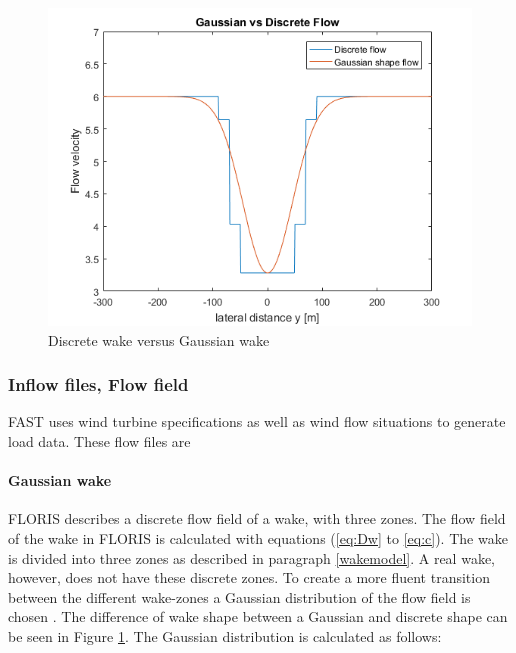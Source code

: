 \begin{figure}
  \includegraphics[width=\linewidth]{./Figures/PlotGausDiscWakeDWake180U6yaw0.png} %
  \caption{Discrete wake versus Gaussian wake} %
  \label{fig:disgaus}
\end{figure}


\subsubsection{Inflow files, Flow field}
FAST uses wind turbine specifications as well as wind flow situations to generate load data. These flow files are 
\paragraph{Gaussian wake}
FLORIS describes a discrete flow field of a wake, with three zones. The flow field of the wake in FLORIS is calculated with equations (\ref{eq:Dw} to \ref{eq:c}). The wake is divided into three zones as described in paragraph \ref{wakemodel}. A real wake, however, does not have these discrete zones. To create a more fluent transition between the different wake-zones a Gaussian distribution of the flow field is chosen \cite{Bastankhah2016}. The difference of wake shape between a Gaussian and discrete shape can be seen in Figure \ref{fig:disgaus}.  The Gaussian distribution is calculated as follows: 

